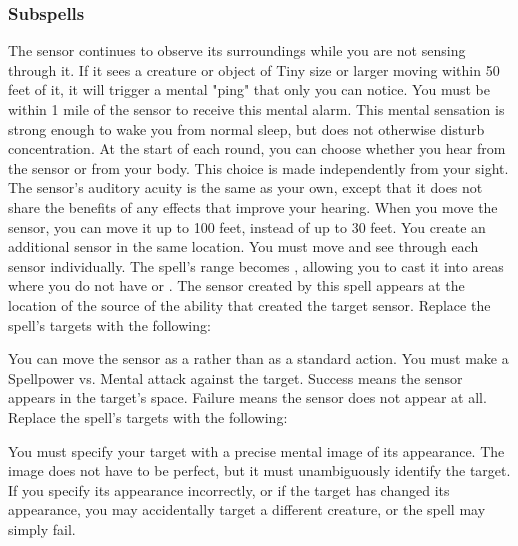 \subsubsection{Subspells}
The sensor continues to observe its surroundings while you are not sensing through it.
If it sees a creature or object of Tiny size or larger moving within 50 feet of it, it will trigger a mental "ping" that only you can notice.
You must be within 1 mile of the sensor to receive this mental alarm.
This mental sensation is strong enough to wake you from normal sleep, but does not otherwise disturb concentration.
At the start of each round, you can choose whether you hear from the sensor or from your body.
This choice is made independently from your sight.
The sensor's auditory acuity is the same as your own, except that it does not share the benefits of any  effects that improve your hearing.
When you move the sensor, you can move it up to 100 feet, instead of up to 30 feet.
You create an additional sensor in the same location.
You must move and see through each sensor individually.
The spell's range becomes \rngunrestricted, allowing you to cast it into areas where you do not have  or .
The sensor created by this spell appears at the location of the source of the ability that created the target sensor.
Replace the spell's targets with the following:
\begin{spellcontent}
\begin{augmenttargetinginfo}
\end{augmenttargetinginfo}
\end{spellcontent}
You can move the sensor as a  rather than as a standard action.
You must make a Spellpower vs. Mental attack against the target.
Success means the sensor appears in the target's space.
Failure means the sensor does not appear at all.
Replace the spell's targets with the following:
\begin{spellcontent}
\begin{augmenttargetinginfo}
\spellspecial
You must specify your target with a precise mental image of its appearance.
The image does not have to be perfect, but it must unambiguously identify the target.
If you specify its appearance incorrectly, or if the target has changed its appearance, you may accidentally target a different creature, or the spell may simply fail.
\end{augmenttargetinginfo}
\end{spellcontent}
